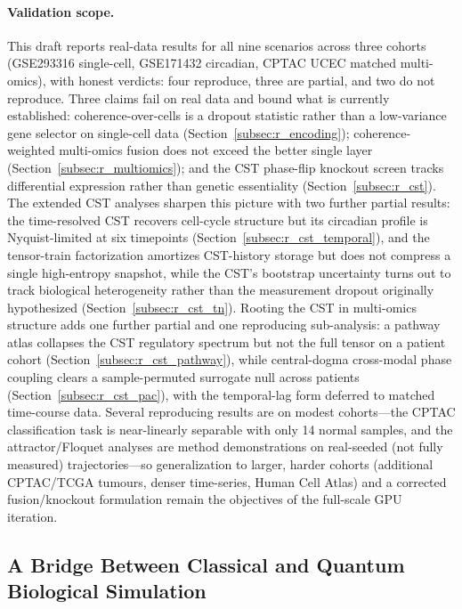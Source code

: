 \documentclass[preprint,12pt,amsmath,amssymb,superscriptaddress,floatfix]{revtex4-2}
\begin{document}
\paragraph{Validation scope.}
This draft reports real-data results for all nine scenarios across three
cohorts (GSE293316 single-cell, GSE171432 circadian, CPTAC UCEC matched
multi-omics), with honest verdicts: four reproduce, three are partial, and two
do not reproduce. Three claims fail on real data and bound what is currently
established: coherence-over-cells is a dropout statistic rather than a
low-variance gene selector on single-cell data
(Section~\ref{subsec:r_encoding}); coherence-weighted multi-omics fusion does
not exceed the better single layer (Section~\ref{subsec:r_multiomics}); and the
CST phase-flip knockout screen tracks differential expression rather than
genetic essentiality (Section~\ref{subsec:r_cst}). The extended CST analyses
sharpen this picture with two further partial results: the time-resolved CST
recovers cell-cycle structure but its circadian profile is Nyquist-limited at
six timepoints (Section~\ref{subsec:r_cst_temporal}), and the tensor-train
factorization amortizes CST-history storage but does not compress a single
high-entropy snapshot, while the CST's bootstrap uncertainty turns out to track
biological heterogeneity rather than the measurement dropout originally
hypothesized (Section~\ref{subsec:r_cst_tn}). Rooting the CST in multi-omics
structure adds one further partial and one reproducing sub-analysis: a pathway
atlas collapses the CST regulatory spectrum but not the full tensor on a patient
cohort (Section~\ref{subsec:r_cst_pathway}), while central-dogma cross-modal
phase coupling clears a sample-permuted surrogate null across patients
(Section~\ref{subsec:r_cst_pac}), with the temporal-lag form deferred to matched
time-course data. Several reproducing results
are on modest cohorts---the CPTAC classification task is near-linearly
separable with only 14 normal samples, and the attractor/Floquet analyses are
method demonstrations on real-seeded (not fully measured) trajectories---so
generalization to larger, harder cohorts (additional CPTAC/TCGA tumours, denser
time-series, Human Cell Atlas) and a corrected fusion/knockout formulation
remain the objectives of the full-scale GPU iteration.

\subsection{A Bridge Between Classical and Quantum Biological Simulation}
\end{document}
